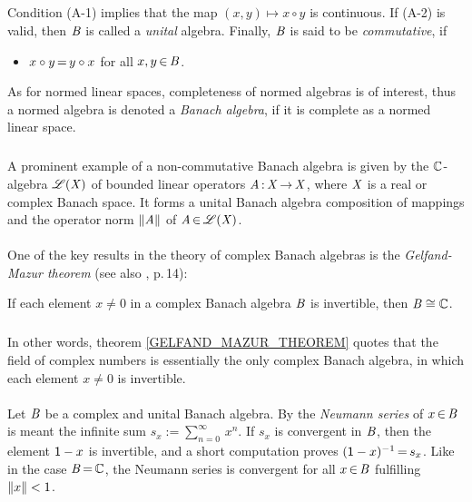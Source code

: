 \documentclass[11pt,twoside]{article}
\begin{document}
\subparagraph{}
Condition (A-1) implies
that the map $(x,y) \mapsto x \circ y$ is continuous.
If (A-2) is valid,
then $\mathit{B}$ is called a \textit{unital} algebra.
Finally,
$\mathit{B}$ is said to be \textit{commutative},
if
\begin{itemize}[leftmargin=16mm,itemsep=2pt]
\item[(A-3)]
\;$x \circ y {\,=\,} y \circ x$ \; for all $x,y {\,\in\,} \mathit{B}$.
\end{itemize}
As for normed linear spaces,
completeness of normed algebras is of interest,
thus a normed algebra is denoted a \textit{Banach algebra},
if it is complete as a normed linear space.

\subparagraph{} %
A prominent example of a non-commutative Banach algebra is given by
the ${\mathbb{C}}$-algebra $\mathscr{L}(\mathit{X})$ of bounded linear operators
$\mathit{A} {\,:\,}\mathit{X} {\,\to\,} \mathit{X}$,
where $\mathit{X}$ is a real or complex Banach space.
It forms a unital Banach algebra {\wrt} composition of mappings
and the operator norm $\left\lVert \mathit{A} \right\rVert$ of $\mathit{A} {\,\in\,} \mathscr{L}(\mathit{X})$.

\paragraph{} %
One of the key results in the theory of complex Banach algebras
is the \textit{Gelfand-Mazur theorem}
(see also \cite{Ka}, p.\,14):

\begin{theorem1}\label{GELFAND_MAZUR_THEOREM}
If each element $x \neq 0$ in a complex Banach algebra $\mathit{B}$ is invertible,
then $\mathit{B} \cong {\mathbb{C}}$.
\end{theorem1}

\subparagraph{}
In other words, 
theorem \ref{GELFAND_MAZUR_THEOREM} quotes that
the field of complex numbers is essentially the only complex Banach algebra,
in which each element $x \neq 0$ is invertible.

\paragraph{} %
Let $\mathit{B}$ be a complex and unital Banach algebra.
By the \textit{Neumann series} of $x {\,\in\,} \mathit{B}$ is meant the infinite sum
$
s_x := \sum_{n=0}^{\infty} \, x^n.
$
If $s_x$ is convergent in $\mathit{B}$,
then the element ${\mathsf{1}}-x$ is invertible,
and a short computation proves $({\mathsf{1}}-x)^{-1} {\,=\,} s_x$.
Like in the case $\mathit{B} {\,=\,} {\mathbb{C}}$,
the {Neumann series} is convergent for all $x {\,\in\,} \mathit{B}$
fulfilling $\left\lVert x \right\rVert < 1$.
\end{document}
